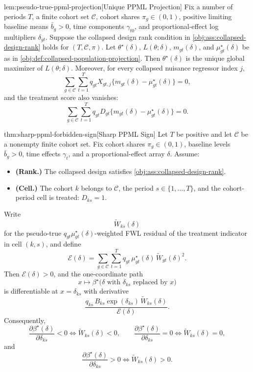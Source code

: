 \begin{lemmav}{lem:pseudo-true-ppml-projection}[Unique PPML Projection]
Fix a number of periods \(T\), a finite cohort set \(\mathcal C\), cohort shares \(\pi_g\in(0,1)\), positive limiting baseline means \(\bar b_g>0\), time components \(\gamma_{t0}\), and proportional-effect log multipliers \(\delta_{gt}\). Suppose the collapsed design rank condition in \cref{obj:ass:collapsed-design-rank} holds for \((T,\mathcal C,\pi)\). Let \(\theta^\star(\delta)\), \(L(\theta;\delta)\), \(m_{gt}(\delta)\), and \(\mu^\star_{gt}(\delta)\) be as in \cref{obj:def:collapsed-population-projection}. Then \(\theta^\star(\delta)\) is the unique global maximizer of \(L(\theta;\delta)\). Moreover, for every collapsed nuisance regressor index \(j\),
\[
\sum_{g\in\mathcal C}\sum_{t=1}^T
q_{gt} X_{gt,j}\{m_{gt}(\delta)-\mu^\star_{gt}(\delta)\}=0,
\]
and the treatment score also vanishes:
\[
\sum_{g\in\mathcal C}\sum_{t=1}^T
q_{gt} D_{gt}\{m_{gt}(\delta)-\mu^\star_{gt}(\delta)\}=0.
\]
\end{lemmav}

\begin{theoremv}{thm:sharp-ppml-forbidden-sign}[Sharp PPML Sign]
Let \(T\) be positive and let \(\mathcal C\) be a nonempty finite cohort set. Fix cohort shares \(\pi_g\in(0,1)\), baseline levels \(\bar b_g>0\), time effects \(\gamma_t\), and a proportional-effect array \(\delta\). Assume:
\begin{itemize}
\item \textbf{(Rank.)} The collapsed design satisfies \cref{obj:ass:collapsed-design-rank}.
\item \textbf{(Cell.)} The cohort \(k\) belongs to \(\mathcal C\), the period \(s\in\{1,\ldots,T\}\), and the cohort-period cell is treated: \(D_{ks}=1\).
\end{itemize}
Write
\[
\widetilde W_{ks}(\delta)
\]
for the pseudo-true \(q_{gt}\mu^\star_{gt}(\delta)\)-weighted FWL residual of the treatment indicator in cell \((k,s)\), and define
\[
\mathcal E(\delta)
=
\sum_{g\in\mathcal C}\sum_{t=1}^T
q_{gt}\,\mu^\star_{gt}(\delta)\,
\widetilde W_{gt}(\delta)^2 .
\]
Then \(\mathcal E(\delta)>0\), and the one-coordinate path
\[
x\mapsto \beta^\star\!\bigl(\delta \text{ with } \delta_{ks}\text{ replaced by }x\bigr)
\]
is differentiable at \(x=\delta_{ks}\) with derivative
\[
\frac{
q_{ks}\,B_{ks}\exp(\delta_{ks})\,\widetilde W_{ks}(\delta)
}{
\mathcal E(\delta)
}.
\]
Consequently,
\[
\frac{\partial \beta^\star(\delta)}{\partial \delta_{ks}}<0
\iff
\widetilde W_{ks}(\delta)<0,\qquad
\frac{\partial \beta^\star(\delta)}{\partial \delta_{ks}}=0
\iff
\widetilde W_{ks}(\delta)=0,
\]
and
\[
\frac{\partial \beta^\star(\delta)}{\partial \delta_{ks}}>0
\iff
\widetilde W_{ks}(\delta)>0.
\]
\end{theoremv}

